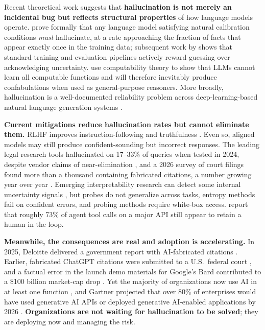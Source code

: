 \documentclass[11pt,a4paper]{article}
\begin{document}
Recent theoretical work suggests that \textbf{hallucination is not merely an incidental bug but reflects structural properties} of how language models operate. \citet{kalai2024} prove formally that any language model satisfying natural calibration conditions \textit{must} hallucinate, at a rate approaching the fraction of facts that appear exactly once in the training data; subsequent work by \citet{kalai2025} shows that standard training and evaluation pipelines actively reward guessing over acknowledging uncertainty. \citet{xu2024} use computability theory to show that LLMs cannot learn all computable functions and will therefore inevitably produce confabulations when used as general-purpose reasoners. More broadly, hallucination is a well-documented reliability problem across deep-learning-based natural language generation systems \citep{ji2023}.

\textbf{Current mitigations reduce hallucination rates but cannot eliminate them.} RLHF improves instruction-following and truthfulness \citep{ouyang2022}. Even so, aligned models may still produce confident-sounding but incorrect responses. The leading legal research tools hallucinated on 17--33\% of queries when tested in 2024, despite vendor claims of near-elimination \citep{magesh2025}, and a 2026 survey of court filings found more than a thousand containing fabricated citations, a number growing year over year \citep{liu2026citations}. Emerging interpretability research can detect some internal uncertainty signals \citep{orgad2025, farquhar2024}, but probes do not generalize across tasks, entropy methods fail on confident errors, and probing methods require white-box access. \citet{mccain2026} report that roughly 73\% of agent tool calls on a major API still appear to retain a human in the loop.

\textbf{Meanwhile, the consequences are real and adoption is accelerating.} In 2025, Deloitte delivered a government report with AI-fabricated citations \citep{deloitte2025}. Earlier, fabricated ChatGPT citations were submitted to a U.S.\ federal court \citep{mata2023}, and a factual error in the launch demo materials for Google's Bard contributed to a \$100 billion market-cap drop \citep{googlebard2023}. Yet the majority of organizations now use AI in at least one function \citep{mckinsey2025}, and Gartner projected that over 80\% of enterprises would have used generative AI APIs or deployed generative AI-enabled applications by 2026 \citep{gartner2023}. \textbf{Organizations are not waiting for hallucination to be solved}; they are deploying now and managing the risk.
\end{document}
